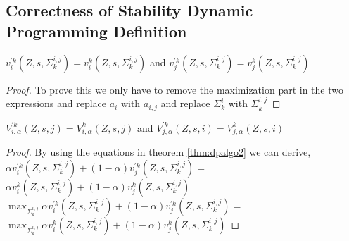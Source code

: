 \subsection{Correctness of Stability Dynamic Programming Definition }

\begin{theorem}
	\label{thm:dpalgo2}
	$v_i^{'k}(Z,s,\Sigma^{i,j}_k)=v_i^{k}(Z,s,\Sigma^{i,j}_k)$ and
	$v_j^{'k}(Z,s,\Sigma^{i,j}_k)=v_j^{k}(Z,s,\Sigma^{i,j}_k)$
\end{theorem}

\begin{proof}
	To prove this we only have to remove the maximization part in the two expressions and replace $a_i$ with $a_{i,j}$ and replace $\Sigma^i_k$ with $\Sigma^{i,j}_k$ 
\end{proof}


\begin{theorem}
	\label{thm:dpalgo2}
	$V_{i,\alpha}^{'k}(Z,s,j)=V_{i,\alpha}^{k}(Z,s,j)$ and
	$V_{j,\alpha}^{'k}(Z,s,i)=V_{j,\alpha}^{k}(Z,s,i)$
\end{theorem}

\begin{proof}
	By using the equations in theorem \ref{thm:dpalgo2} we can derive,\\
	$\alpha v_i^{'k}(Z,s,\Sigma^{i,j}_k) + (1-\alpha)v_j^{'k}(Z,s,\Sigma^{i,j}_k)=$
	$\alpha v_i^{k}(Z,s,\Sigma^{i,j}_k) + (1-\alpha)v_j^{k}(Z,s,\Sigma^{i,j}_k) $\\
	$\max_{\Sigma^{i,j}_k} \alpha v_i^{'k}(Z,s,\Sigma^{i,j}_k) + (1-\alpha)v_j^{'k}(Z,s,\Sigma^{i,j}_k)=$
	$\max_{\Sigma^{i,j}_k}\alpha v_i^{k}(Z,s,\Sigma^{i,j}_k) + (1-\alpha)v_j^{k}(Z,s,\Sigma^{i,j}_k) $
\end{proof}
